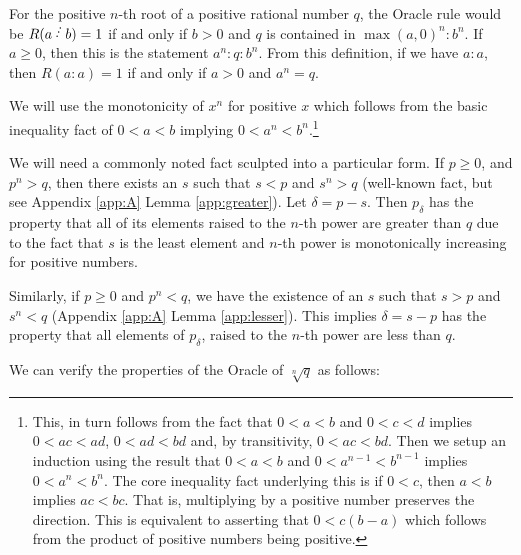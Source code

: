 \documentclass[12pt]{article}
\begin{document}
For the positive $n$-th root of a positive rational number $q$, the Oracle rule would be $R(a\lte b) = 1$ if and only if $b> 0$ and $q$ is contained in $\max(a,0)^n:b^n$. If $a\geq 0$, then this is the statement $a^n:q:b^n$. From this definition, if we have $a:a$, then $R(a:a) = 1$ if and only if $a>0$ and $a^n = q$.

We will use the monotonicity of $x^n$ for positive $x$ which follows from the basic inequality fact of $ 0 < a < b$ implying $0 < a^n < b^n$.\footnote{This, in turn follows from the fact that $0<a<b$ and $0<c<d$ implies $0<ac<ad$, $0<ad<bd$ and, by transitivity, $0<ac<bd$. Then we setup an induction using the result that $0 < a<b$ and $0 < a^{n-1} < b^{n-1}$ implies $0 < a^n < b^n$. The core inequality fact underlying this is if $0<c$, then $a<b$ implies $ac < bc$. That is, multiplying by a positive number preserves the direction. This is equivalent to asserting that $0 < c (b-a)$ which follows from the product of positive numbers being positive.}

We will need a commonly noted fact sculpted into a particular form. If $p \geq 0$, and $p^n > q$, then there exists an $s$ such that $s<p$ and $s^n > q$ (well-known fact, but see Appendix \ref{app:A} Lemma \ref{app:greater}). Let $\delta = p-s$. Then $p_\delta$ has the property that all of its elements raised to the $n$-th power are greater than $q$ due to the fact that $s$ is the least element and $n$-th power is monotonically increasing for positive numbers. 

Similarly, if $p \geq 0$ and $p^n < q$, we have the existence of an $s$ such that $s > p$ and $s^n < q$ (Appendix \ref{app:A} Lemma \ref{app:lesser}). This implies $\delta = s-p$ has the property that all elements of $p_\delta$, raised to the $n$-th power are less than $q$. 

We can verify the properties of the Oracle of $\sqrt[n]{q}$ as follows: 
\end{document}
